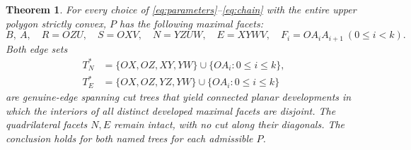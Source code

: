 \documentclass[11pt]{amsart}
\newtheorem{theorem}{Theorem}[section]
\begin{document}
\begin{theorem}\label{thm:main}
For every choice of \eqref{eq:parameters}--\eqref{eq:chain} with the entire upper polygon strictly convex, \(P\) has the following maximal facets:
\begin{equation}\label{eq:faces}
 B,\ A,\quad R=OZU,\quad S=OXV,\quad
 N=YZUW,\quad E=XYWV,\quad
 F_i=OA_iA_{i+1}\ (0\le i<k).
\end{equation}
Both edge sets
\begin{align}
 T_N^*&=\{OX,OZ,XY,YW\}\cup\{OA_i:0\le i\le k\},\label{eq:treeN}\\
 T_E^*&=\{OX,OZ,YZ,YW\}\cup\{OA_i:0\le i\le k\}\label{eq:treeE}
\end{align}
are genuine-edge spanning cut trees that yield connected planar developments in which the interiors of all distinct developed maximal facets are disjoint. The quadrilateral facets \(N,E\) remain intact, with no cut along their diagonals. The conclusion holds for both named trees \emph{for each} admissible \(P\).
\end{theorem}
\end{document}
